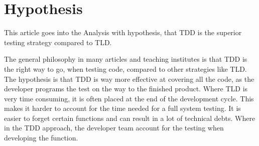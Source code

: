 \section{Hypothesis}
\label{section:hypothesis}

This article goes into the Analysis with hypothesis, 
that TDD is the superior testing strategy compared to TLD.\newline

 
The general philosophy in many articles and teaching institutes is that TDD is the right way to go, when testing code, 
compared to other strategies like TLD. The hypothesis is that TDD is way more effective at covering all the code, 
as the developer programs the test on the way to the finished product.  
Where TLD is very time consuming, it is often placed at the end of the development cycle. 
This makes it harder to account for the time needed for a full system testing. 
It is easier to forget certain functions and can result in a lot of technical debts. 
Where in the TDD approach, the developer team account for the testing when developing the function.
